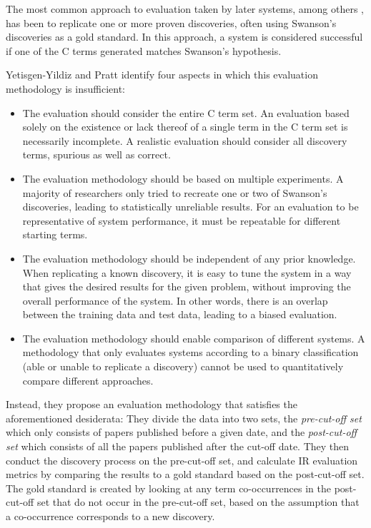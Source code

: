 The most common approach to evaluation taken by later systems, among others \cite{lin99,wee01,sri04}, has been to replicate one or more proven discoveries, often using Swanson's discoveries as a gold standard. In this approach, a system is considered successful if one of the C terms generated matches Swanson's hypothesis. 

Yetisgen-Yildiz and Pratt\cite{yet09} identify four aspects in which this evaluation methodology is insufficient:
\begin{itemize}
	\item The evaluation should consider the entire C term set. An evaluation based solely on the existence or lack thereof of a single term in the C term set is necessarily incomplete. A realistic evaluation should consider all discovery terms, spurious as well as correct.
	\item The evaluation methodology should be based on multiple experiments. A majority of researchers only tried to recreate one or two of Swanson's discoveries, leading to statistically unreliable results. For an evaluation to be representative of system performance, it must be repeatable for different starting terms.
	\item The evaluation methodology should be independent of any prior knowledge. When replicating a known discovery, it is easy to tune the system in a way that gives the desired results for the given problem, without improving the overall performance of the system. In other words, there is an overlap between the training data and test data, leading to a biased evaluation.
	\item The evaluation methodology should enable comparison of different systems. A methodology that only evaluates systems according to a binary classification (able or unable to replicate a discovery) cannot be used to quantitatively compare different approaches.
\end{itemize}

Instead, they propose an evaluation methodology that satisfies the aforementioned desiderata: They divide the data into two sets, the \emph{pre-cut-off set} which only consists of papers published before a given date, and the \emph{post-cut-off set} which consists of all the papers published after the cut-off date. They then conduct the discovery process on the pre-cut-off set, and calculate IR evaluation metrics by comparing the results to a gold standard based on the post-cut-off set. The gold standard is created by looking at any term co-occurrences in the post-cut-off set that do not occur in the pre-cut-off set, based on the assumption that a co-occurrence corresponds to a new discovery.

